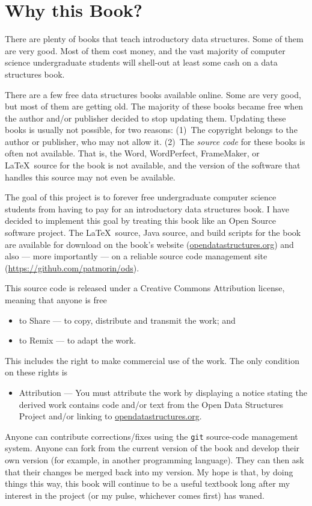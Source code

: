 \chapter*{Why this Book?}

There are plenty of books that teach introductory data structures.
Some of them are very good.  Most of them cost money, and the vast
majority of computer science undergraduate students will shell-out at
least some cash on a data structures book.

There are a few free data structures books available online.  Some are
very good, but most of them are getting old.  The majority of these
books became free when the author and/or publisher decided to stop
updating them.  Updating these books is usually not possible, for two
reasons:  (1)~The copyright belongs to the author or publisher, who
may not allow it.  (2)~The \emph{source code} for these books is often
not available.  That is, the Word, WordPerfect, FrameMaker, or \LaTeX\
source for the book is not available, and the version of the software
that handles this source may not even be available.

The goal of this project is to forever free undergraduate computer science
students from having to pay for an introductory data structures book.
I have decided to implement this goal by treating this book like an
Open Source software project.  The \LaTeX\ source, Java source, and
build scripts for the book are available for download on the book's website
(\url{opendatastructures.org}) and also --- more importantly --- on a reliable
source code management site (\url{https://github.com/patmorin/ods}).

This source code is released under a Creative Commons Attribution license,
meaning that anyone is free
\begin{itemize}
  \item to Share --- to copy, distribute and transmit the work; and
  \item to Remix --- to adapt the work.
\end{itemize}
This includes the right to make commercial use of the work.  The only
condition on these rights is
\begin{itemize}
  \item Attribution --- You must attribute the work by displaying a
  notice stating the derived work contains code and/or text from the
  Open Data Structures Project and/or linking to
  \url{opendatastructures.org}.
\end{itemize}

Anyone can contribute corrections/fixes using the \texttt{git} source-code
management system.  Anyone can fork from the current version of the
book and develop their own version (for example, in another programming
language).  They can then ask that their changes be merged back into
my version.  My hope is that, by doing things this way, this book will
continue to be a useful textbook long after my interest in the project
(or my pulse, whichever comes first) has waned.


